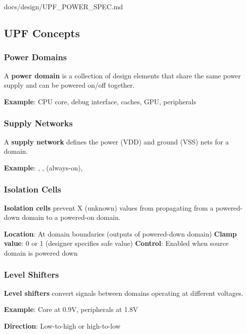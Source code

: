 \begin{relocated}{docs/design/UPF_POWER_SPEC.md}
\subsection{UPF Concepts}\label{ds:ch:upf-power-spec:upf-concepts}

\subsubsection{Power Domains}\label{ds:ch:upf-power-spec:power-domains}

A \textbf{power domain} is a collection of design elements that share
the same power supply and can be powered on/off together.

\textbf{Example}: CPU core, debug interface, caches, GPU, peripherals

\subsubsection{Supply Networks}\label{ds:ch:upf-power-spec:supply-networks}

A \textbf{supply network} defines the power (VDD) and ground (VSS) nets
for a domain.

\textbf{Example}: , , 
(always-on), 

\subsubsection{Isolation Cells}\label{ds:ch:upf-power-spec:isolation-cells}

\textbf{Isolation cells} prevent X (unknown) values from propagating
from a powered-down domain to a powered-on domain.

\textbf{Location}: At domain boundaries (outputs of powered-down domain)
\textbf{Clamp value}: 0 or 1 (designer specifies safe value)
\textbf{Control}: Enabled when source domain is powered down

\subsubsection{Level Shifters}\label{ds:ch:upf-power-spec:level-shifters}

\textbf{Level shifters} convert signals between domains operating at
different voltages.

\textbf{Example}: Core at 0.9V, peripherals at 1.8V

\textbf{Direction}: Low-to-high or high-to-low


\end{relocated}

